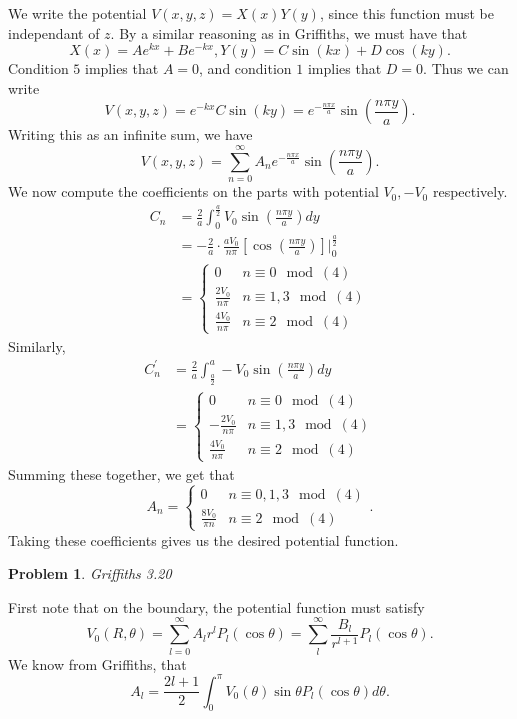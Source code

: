 \documentclass[12pt, a4paper]{article}
\newtheorem{problem}{Problem}
\theoremstyle{definition}
\begin{document}
We write the potential $V(x,y,z) = X(x)Y(y)$, since this function must be independant of $z$. 
By a similar reasoning as in Griffiths, we must have that $$X(x) = Ae^{kx} + Be^{-kx}, Y(y) = C\sin(kx) + D\cos(ky).$$
Condition $5$ implies that $A = 0$, and condition $1$ implies that $D =0$. Thus we can write $$V(x,y,z) = e^{-kx} C\sin(ky) = e^{-\frac{n\pi x}{a}} \sin \left(\frac{n\pi y}{a} \right).$$
Writing this as an infinite sum, we have $$V(x,y,z) = \sum_{n=0}^\infty A_n e^{-\frac{n\pi x}{a}} \sin \left(\frac{n\pi y}{a} \right).$$
We now compute the coefficients on the parts with potential $V_0, -V_0$ respectively. 
\begin{align*}
	C_n & = \frac{2}{a} \int_{0}^{\frac{a}{2}} V_0 \sin \left(\frac{n\pi y}{a}\right) dy
	\\ & = - \frac{2}{a} \cdot \frac{aV_0}{n\pi } \left[ \cos \left( \frac{n\pi y}{a} \right) \right] \Bigg|_{0}^{\frac{a}{2}}
	\\ & = \begin{cases}
		0 & n \equiv 0 \mod(4)\\
		\frac{2V_0}{n\pi} & n \equiv 1,3 \mod(4)\\
		\frac{4V_0}{n\pi} & n\equiv 2 \mod(4)
	\end{cases}
\end{align*}
Similarly,
\begin{align*}
	C_n^\prime & = \frac{2}{a} \int_{\frac{a}{2}}^a -V_0 \sin \left( \frac{n\pi y}{a}\right) dy
	\\ & = \begin{cases}
		0 & n \equiv 0 \mod(4)\\
		-\frac{2V_0}{n\pi} & n\equiv 1,3 \mod(4)\\
		\frac{4V_0}{n\pi} & n\equiv 2 \mod(4)
	\end{cases}
\end{align*}
Summing these together, we get that 
$$A_n = \begin{cases} 0 & n\equiv 0,1,3 \mod(4) \\ \frac{8V_0}{\pi n} & n \equiv 2 \mod(4)  \end{cases}.$$
Taking these coefficients gives us the desired potential function. 
\newpage
\begin{problem}
Griffiths 3.20
\end{problem}
First note that on the boundary, the potential function must satisfy $$V_0(R,\theta) = \sum_{l=0}^\infty A_l r^l P_l( \cos \theta) = \sum_{l}^\infty \frac{B_l}{r^{l+1}} P_l(\cos \theta). $$
We know from Griffiths, that $$A_l = \frac{2l+1}{2} \int_0^\pi V_0(\theta) \sin \theta P_l(\cos\theta) d\theta .$$
\end{document}
